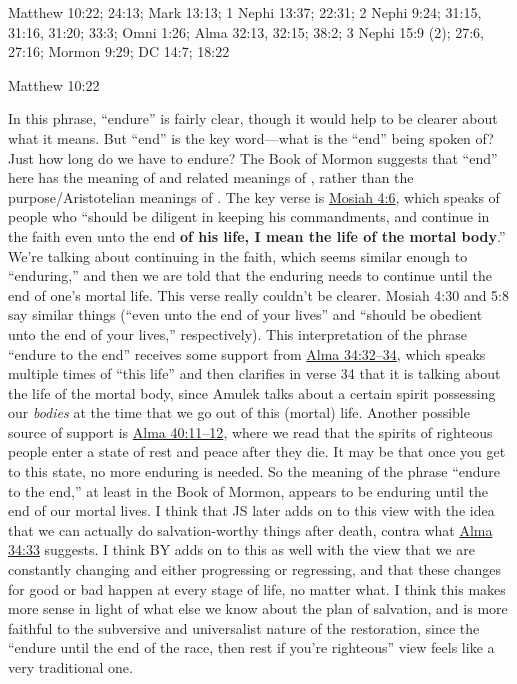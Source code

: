 \begin{compactdesc}
		\item[endure to the end] Matthew 10:22; 24:13; Mark 13:13; 1 Nephi 13:37; 22:31; 2 Nephi 9:24; 31:15, 31:16, 31:20; 33:3; Omni 1:26; Alma 32:13, 32:15; 38:2; 3 Nephi 15:9 (2); 27:6, 27:16; Mormon 9:29; DC 14:7; 18:22
			\begin{compactdesc}
				\item[Bible anchor verses] Matthew 10:22
					\begin{compactdesc}
						\item[Matthew 10:22] 
					\end{compactdesc}
				\item[Commentary] In this phrase, ``endure'' is fairly clear, though it would help to be clearer about what it means. But ``end'' is the key word---what is the ``end'' being spoken of? Just how long do we have to endure? The Book of Mormon suggests that ``end'' here has the meaning of  and related meanings of , rather than the purpose/Aristotelian meanings of . The key verse is \hyperref[MOSIAH-4-6]{Mosiah 4:6}, which speaks of people who ``should be diligent in keeping his commandments, and continue in the faith even unto the end \textbf{of his life, I mean the life of the mortal body}.'' We're talking about continuing in the faith, which seems similar enough to ``enduring,'' and then we are told that the enduring needs to continue until the end of one's mortal life. This verse really couldn't be clearer. Mosiah 4:30 and 5:8 say similar things (``even unto the end of your lives'' and ``should be obedient unto the end of your lives,'' respectively). This interpretation of the phrase ``endure to the end'' receives some support from \hyperref[ALMA-34-32]{Alma 34:32--34}, which speaks multiple times of ``this life'' and then clarifies in verse 34 that it is talking about the life of the mortal body, since Amulek talks about a certain spirit possessing our \textit{bodies} at the time that we go out of this (mortal) life. Another possible source of support is \hyperref[ALMA-40-11]{Alma 40:11--12}, where we read that the spirits of righteous people enter a state of rest and peace after they die. It may be that once you get to this state, no more enduring is needed. So the meaning of the phrase ``endure to the end,'' at least in the Book of Mormon, appears to be enduring until the end of our mortal lives. I think that JS later adds on to this view with the idea that we can actually do salvation-worthy things after death, contra what \hyperref[ALMA-34-33]{Alma 34:33} suggests. I think BY adds on to this as well with the view that we are constantly changing and either progressing or regressing, and that these changes for good or bad happen at every stage of life, no matter what. I think this makes more sense in light of what else we know about the plan of salvation, and is more faithful to the subversive and universalist nature of the restoration, since the ``endure until the end of the race, then rest if you're righteous'' view feels like a very traditional one.
			\end{compactdesc}
			

\end{compactdesc}
